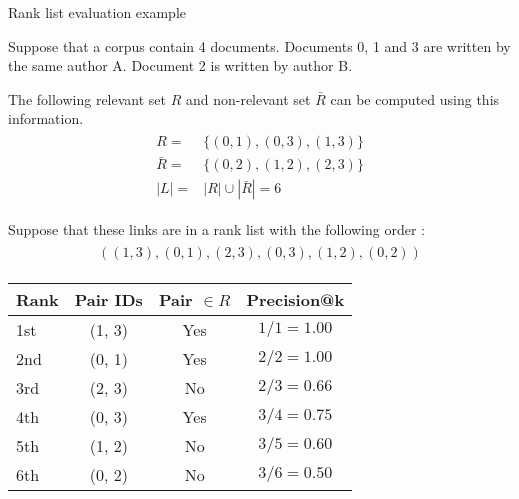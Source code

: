 \begin{example}
  \centering
  \caption{Rank list evaluation example}
  \label{ex:rank_list_eval}

  \begin{subexample}{\linewidth}

  Suppose that a corpus contain 4 documents.
  Documents 0, 1 and 3 are written by the same author A.
  Document 2 is written by author B.

  The following relevant set $R$ and non-relevant set $\bar{R}$ can be computed using this information.
  \begin{gather*}
    \begin{split}
            R =& \{(0, 1), (0, 3), (1, 3) \} \\
      \bar{R} =& \{(0, 2), (1, 2), (2, 3) \} \\
          |L| =& |R| \cup |\bar{R}| = 6
    \end{split}
  \end{gather*}

  Suppose that these links are in a rank list with the following order :
  \begin{gather*}
    \begin{split}
      ((1, 3), (0, 1), (2, 3), (0, 3), (1, 2), (0, 2))
    \end{split}
  \end{gather*}
  \end{subexample}

  \vspace{0.5cm}

  \begin{subexample}{\linewidth}
    \centering
    \begin{tabular}{l c c c}
      \toprule
      Rank  & Pair IDs & Pair $\in R$ & Precision@k\\
      \midrule
      1st   & (1, 3)   & Yes  & $1/1 = 1.00$ \\
      2nd   & (0, 1)   & Yes  & $2/2 = 1.00$ \\
      3rd   & (2, 3)   & No   & $2/3 = 0.66$ \\
      4th   & (0, 3)   & Yes  & $3/4 = 0.75$ \\
      5th   & (1, 2)   & No   & $3/5 = 0.60$ \\
      6th   & (0, 2)   & No   & $3/6 = 0.50$ \\
      \bottomrule
    \end{tabular}
  \end{subexample}


\end{example}
